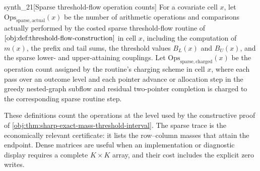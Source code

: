 \documentclass[11pt]{article}
\begin{document}
\begin{definitionv}{synth_21}[Sparse threshold-flow operation counts]
For a covariate cell \(x\), let \(\mathrm{Ops}_{\mathrm{sparse,actual}}(x)\) be the number of arithmetic operations and comparisons actually performed by the costed sparse threshold-flow routine of \(\cref{obj:def:threshold-flow-construction}\) in cell \(x\), including the computation of \(m(x)\), the prefix and tail sums, the threshold values \(B_L(x)\) and \(B_U(x)\), and the sparse lower- and upper-attaining couplings. Let \(\mathrm{Ops}_{\mathrm{sparse,charged}}(x)\) be the operation count assigned by the routine's charging scheme in cell \(x\), where each pass over an outcome level and each pointer advance or allocation step in the greedy nested-graph subflow and residual two-pointer completion is charged to the corresponding sparse routine step.
\end{definitionv}

These definitions count the operations at the level used by the constructive proof of \cref{obj:thm:sharp-exact-mass-threshold-interval}.  The sparse trace is the economically relevant certificate: it lists the row--column masses that attain the endpoint.  Dense matrices are useful when an implementation or diagnostic display requires a complete \(K\times K\) array, and their cost includes the explicit zero writes.
\end{document}
